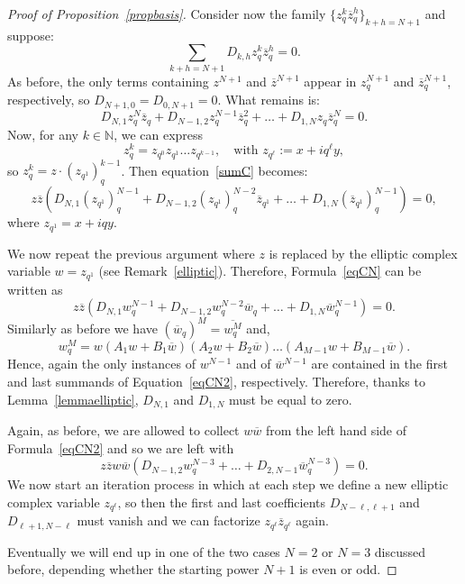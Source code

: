 \documentclass[10pt]{amsart}
\theoremstyle{plain}
\theoremstyle{definition}
\renewcommand{\bar}[1]{\overline{#1}}
\begin{document}
\begin{proof}[Proof of Proposition~\ref{propbasis}]
 Consider now the family $ \{z_q^k \bar{z}_q^h\}_{k + h = N+1} $ and suppose:
\[
\sum_{k+h = N+1} D_{k,h} z_q^k \bar{z}_q^h = 0.
\]
As before, the only terms containing $ z^{N+1} $ and $ \bar{z}^{N+1} $ appear in $ z_q^{N+1} $ and $ \bar{z}_q^{N+1} $, respectively, so $ D_{N+1,0} = D_{0,N+1} = 0 $. What remains is:
\begin{equation}\label{sumC}
D_{N,1} z_q^N \bar{z}_q + D_{N-1,2} z_q^{N-1} \bar{z}_q^2 + \dots + D_{1,N} z_q \bar{z}_q^N = 0.
\end{equation}
Now, for any $ k \in \mathbb{N} $, we can express
\[
z_q^k = z_{q^0} z_{q^1} \dots z_{q^{k-1}}, \quad \text{with } z_{q^\ell} := x + i q^\ell y,
\]
so $ z_q^k = z \cdot (z_{q^1})_q^{k-1} $. Then equation~\eqref{sumC} becomes:
\begin{equation}\label{eqCN}
z \bar{z} \left( D_{N,1}(z_{q^1})_q^{N-1} + D_{N-1,2}(z_{q^1})_q^{N-2} \bar{z}_{q^1} + \dots + D_{1,N}(\bar{z}_{q^1})_q^{N-1} \right) = 0,
\end{equation}
where $ z_{q^1} = x + i q y $. 

We now repeat the previous argument where $z$ is replaced by the elliptic complex variable
$w=z_{q^{1}}$ (see Remark~\ref{elliptic}). Therefore, Formula~\eqref{eqCN} can be written as
 \begin{equation}\label{eqCN2}
z \bar{z} \left( D_{N,1}w_q^{N-1} + D_{N-1,2}w_q^{N-2} \bar w_{q} + \dots + D_{1,N}\bar w_q^{N-1} \right) = 0.
\end{equation}
Similarly as before we have $(\bar w_{q})^{M}=\overline{w_{q}^{M}}$ and,
\[
w_q^{M} = w\left(A_{1}w + B_{1}\bar{w}\right)
\left(A_{2}w + B_{2}\bar{w}\right)
\dots \left(A_{M-1}w + B_{M-1}\bar{w}\right).
\]
Hence, again the only instances of $w^{N-1}$ and of $\bar w^{N-1}$ are contained in the first and last summands of Equation~\eqref{eqCN2}, respectively. 
Therefore, thanks to Lemma~\ref{lemmaelliptic}, $D_{N,1}$ and
$D_{1,N}$ must be equal to zero.

Again, as before, we are allowed to collect $w\bar w$ from 
the left hand side of Formula~\eqref{eqCN2} and so we are left with 
$$z \bar{z} w\bar w\left( D_{N-1,2}w_q^{N-3} + \dots +D_{2,N-1}\bar w_{q}^{N-3} \right) = 0.
$$
We now start an iteration process in which at each step we define a new elliptic complex variable $z_{q^{\ell}}$, so then the first and last coefficients $D_{N-\ell,\ell+1}$ and
$D_{\ell+1,N-\ell}$ must vanish and we can factorize $z_{q^{\ell}}\bar z_{q^{\ell}}$ again.

Eventually we will end up in one of the two cases $N=2$ or $N=3$ discussed before, depending whether the starting power $N+1$ is even or odd. 
\end{proof}
\end{document}
